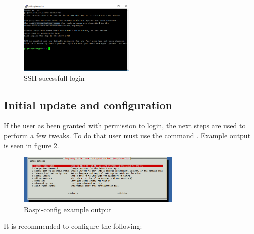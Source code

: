 \begin{figure}[!h]
	\centering
	\includegraphics[trim={0 3cm 0 0}, clip, width=0.5\textwidth]{figures/ssh_sucessfull.png}
	\caption{SSH sucessfull login}
	\label{fig:ssh_successfull}
\end{figure}

\subsection{Initial update and configuration}
If the user as been granted with permission to login, the next steps are used to perform a few tweaks.
To do that user must use the command . Example output is seen in figure \ref{fig:raspi_config}.

\begin{figure}[!hb]
	\centering
	\includegraphics[width=0.7\textwidth]{figures/raspi-config}
	\caption{Raspi-config example output}
	\label{fig:raspi_config}
\end{figure}

It is recommended to configure the following:

